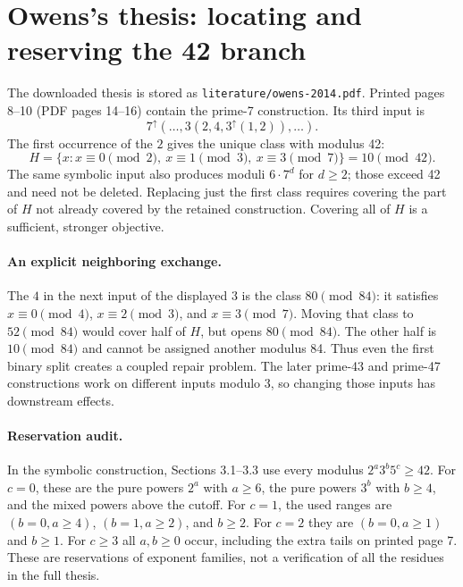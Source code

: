 \documentclass[11pt]{article}
\begin{document}
\section{Owens's thesis: locating and reserving the 42 branch}
The downloaded thesis is stored as \texttt{literature/owens-2014.pdf}.
Printed pages 8--10 (PDF pages 14--16) contain the prime-7 construction.
Its third input is
\[
 7^\uparrow(\ldots,3(2,4,3^\uparrow(1,2)),\ldots).
\]
The first occurrence of the $2$ gives the unique class with modulus 42:
\[
 H=\{x:x\equiv0\pmod2,\ x\equiv1\pmod3,\ x\equiv3\pmod7\}
   =10\pmod{42}.
\]
The same symbolic input also produces moduli $6\cdot7^d$ for $d\geq2$;
those exceed 42 and need not be deleted. Replacing just the first class
requires covering the part of $H$ not already covered by the retained
construction. Covering all of $H$ is a sufficient, stronger objective.

\paragraph{An explicit neighboring exchange.}
The $4$ in the next input of the displayed $3$ is the class $80\pmod{84}$:
it satisfies $x\equiv0\pmod4$, $x\equiv2\pmod3$, and $x\equiv3\pmod7$.
Moving that class to $52\pmod{84}$ would cover half of $H$, but opens
$80\pmod{84}$. The other half is $10\pmod{84}$ and cannot be assigned
another modulus 84. Thus even the first binary split creates a coupled
repair problem. The later prime-43 and prime-47 constructions work on
different inputs modulo 3, so changing those inputs has downstream effects.

\paragraph{Reservation audit.}
In the symbolic construction, Sections 3.1--3.3 use every modulus
$2^a3^b5^c\geq42$. For $c=0$, these are the pure powers $2^a$ with $a\geq6$,
the pure powers $3^b$ with $b\geq4$, and the mixed powers above the cutoff.
For $c=1$, the used ranges are $(b=0,a\geq4)$, $(b=1,a\geq2)$,
and $b\geq2$. For $c=2$ they are $(b=0,a\geq1)$ and $b\geq1$.
For $c\geq3$ all $a,b\geq0$ occur, including the extra tails on printed
page 7. These are reservations of exponent families, not a verification of
all the residues in the full thesis.
\end{document}
